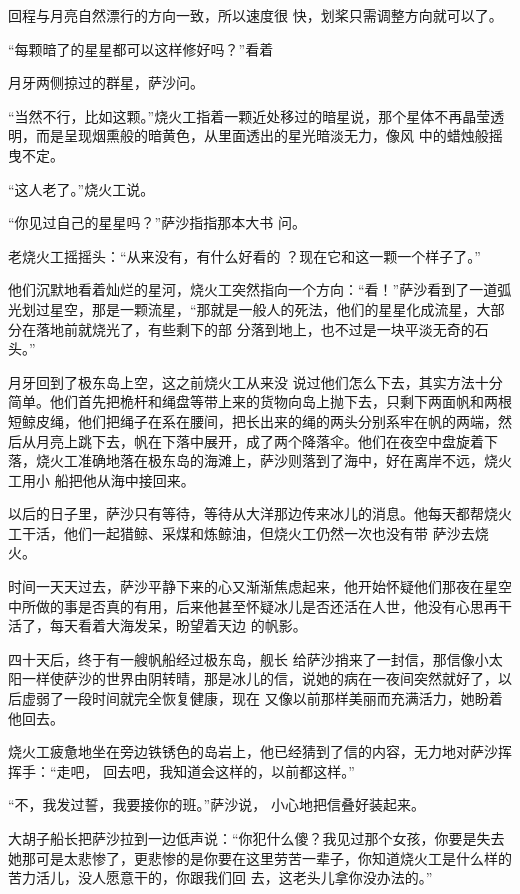 \documentclass{article}
\begin{document}
回程与月亮自然漂行的方向一致，所以速度很
快，划桨只需调整方向就可以了。 

“每颗暗了的星星都可以这样修好吗？”看着

\newpage
月牙两侧掠过的群星，萨沙问。 

“当然不行，比如这颗。”烧火工指着一颗近处移过的暗星说，那个星体不再晶莹透明，而是呈现烟熏般的暗黄色，从里面透出的星光暗淡无力，像风
中的蜡烛般摇曳不定。 


“这人老了。”烧火工说。 

“你见过自己的星星吗？”萨沙指指那本大书
问。 

老烧火工摇摇头：“从来没有，有什么好看的
？现在它和这一颗一个样子了。” 

他们沉默地看着灿烂的星河，烧火工突然指向一个方向：“看！”萨沙看到了一道弧光划过星空，那是一颗流星，“那就是一般人的死法，他们的星星化成流星，大部分在落地前就烧光了，有些剩下的部
分落到地上，也不过是一块平淡无奇的石头。” 

月牙回到了极东岛上空，这之前烧火工从来没
\newpage
说过他们怎么下去，其实方法十分简单。他们首先把桅杆和绳盘等带上来的货物向岛上抛下去，只剩下两面帆和两根短鲸皮绳，他们把绳子在系在腰间，把长出来的绳的两头分别系牢在帆的两端，然后从月亮上跳下去，帆在下落中展开，成了两个降落伞。他们在夜空中盘旋着下落，烧火工准确地落在极东岛的海滩上，萨沙则落到了海中，好在离岸不远，烧火工用小
船把他从海中接回来。 

以后的日子里，萨沙只有等待，等待从大洋那边传来冰儿的消息。他每天都帮烧火工干活，他们一起猎鲸、采煤和炼鲸油，但烧火工仍然一次也没有带
萨沙去烧火。 

时间一天天过去，萨沙平静下来的心又渐渐焦虑起来，他开始怀疑他们那夜在星空中所做的事是否真的有用，后来他甚至怀疑冰儿是否还活在人世，他没有心思再干活了，每天看着大海发呆，盼望着天边
的帆影。 

四十天后，终于有一艘帆船经过极东岛，舰长
\newpage
给萨沙捎来了一封信，那信像小太阳一样使萨沙的世界由阴转晴，那是冰儿的信，说她的病在一夜间突然就好了，以后虚弱了一段时间就完全恢复健康，现在
又像以前那样美丽而充满活力，她盼着他回去。 

烧火工疲惫地坐在旁边铁锈色的岛岩上，他已经猜到了信的内容，无力地对萨沙挥挥手：“走吧，
回去吧，我知道会这样的，以前都这样。” 

“不，我发过誓，我要接你的班。”萨沙说，
小心地把信叠好装起来。 

大胡子船长把萨沙拉到一边低声说：“你犯什么傻？我见过那个女孩，你要是失去她那可是太悲惨了，更悲惨的是你要在这里劳苦一辈子，你知道烧火工是什么样的苦力活儿，没人愿意干的，你跟我们回
去，这老头儿拿你没办法的。” 
\end{document}
